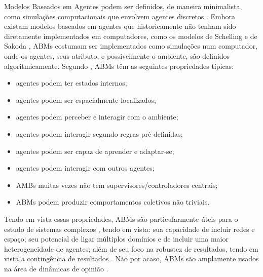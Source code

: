 Modelos Baseados em Agentes podem ser definidos, de maneira minimalista, como
simulações computacionais que envolvem agentes discretos
\cite{sayama2015introduction}. Embora existam modelos baseados em agentes que
historicamente não tenham sido diretamente implementados em computadores, como
os modelos de Schelling e de Sakoda \cite{hegselmann2017thomas}, ABMs costumam
ser implementados como simulações num computador, onde os agentes, seus
atributo, e possivelmente o ambiente, são definidos algoritmicamente. Segundo
, ABMs têm as seguintes propriedades
típicas:
\begin{itemize}
\item agentes podem ter estados internos;
\item agentes podem ser espacialmente localizados;
\item agentes podem perceber e interagir com o ambiente;
\item agentes podem interagir segundo regras pré-definidas;
\item agentes podem ser capaz de aprender e adaptar-se;
\item agentes podem interagir com outros agentes;
\item AMBs muitas vezes não tem supervisores/controladores centrais;
  \item ABMs podem produzir comportamentos coletivos não triviais.
  \end{itemize}

  Tendo em vista essas propriedades, ABMs são particularmente úteis para o
  estudo de sistemas complexos \cite{wilensky2015introduction}, tendo em vista:
  sua capacidade de incluir redes e espaço;  seu potencial de ligar múltiplos
  domínios e de incluir uma maior heterogeneidade de agentes; além de seu foco
  na robustez de resultados, tendo em vista a contingência de resultados
  \cite{de2014agent,wilensky2015introduction}. Não por acaso, ABMs são
  amplamente usados na área de dinâmicas de opinião
  \cite{castellano2012social,flache2017}.

